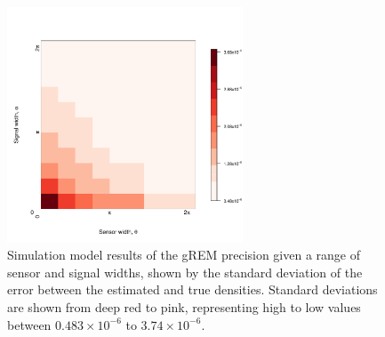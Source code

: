 \documentclass[a4paper,10pt,reqno,oneside]{amsart}
\begin{document}
\begin{figure}[h!]
	\includegraphics[width=7cm]{../imgs/ResultStandardDeviation.pdf}
	\caption{Simulation model results of the gREM precision given a range of sensor and signal widths, shown by the standard deviation of the error between the estimated and true densities. Standard deviations are shown from deep red to pink, representing high to low values between $0.483\times10^{-6}$ to $3.74\times10^{-6}$. 
        } 
	\label{f:StandardDevaition}
\end{figure}
\end{document}
